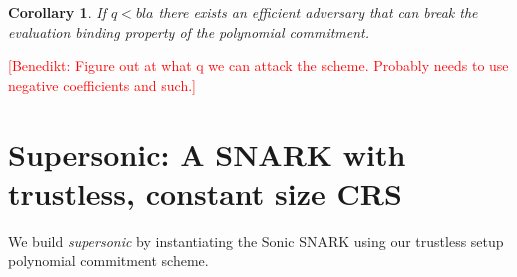 \documentclass{article}
\newtheorem{corollary}{Corollary}
\newcommand{\benedikt}[1]{{\textcolor{red}{[Benedikt: #1]}}}
\newcommand{\benedikt}[1]{}
\begin{document}
\begin{corollary}
	If $q<bla$ there exists an efficient adversary that can break the evaluation binding property of the polynomial commitment.
\end{corollary}
\benedikt{Figure out at what q we can attack the scheme. Probably needs to use negative coefficients and such.}
\section{Supersonic: A SNARK with trustless, constant size CRS}
We build \emph{supersonic} by instantiating the Sonic SNARK using our trustless setup polynomial commitment scheme.
  
\end{document}

